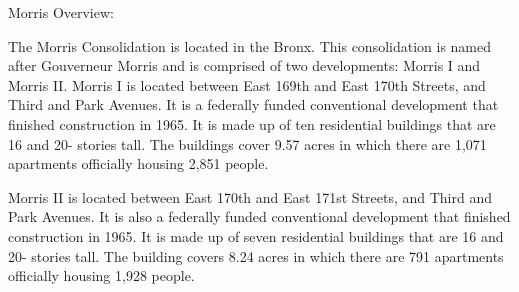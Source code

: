 Morris Overview:     

   

The Morris Consolidation is located in the Bronx. This consolidation is named after Gouverneur Morris and is comprised of two developments: Morris I and Morris II. Morris I is located between East 169th and East 170th Streets, and Third and Park Avenues. It is a federally funded conventional development that finished construction in 1965. It is made up of ten residential buildings that are 16 and 20- stories tall. The buildings cover 9.57 acres in which there are 1,071 apartments officially housing 2,851 people. 

Morris II is located between East 170th and East 171st Streets, and Third and Park Avenues. It is also a federally funded conventional development that finished construction in 1965.  It is made up of seven residential buildings that are 16 and 20- stories tall. The building covers 8.24 acres in which there are 791 apartments officially housing 1,928 people.